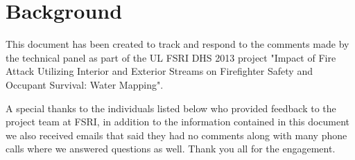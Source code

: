 \documentclass[12pt,oneside]{book}
\begin{document}
\mainmatter

\chapter*{Background}
\label{background}

This document has been created to track and respond to the comments made by the technical panel as part of the UL FSRI DHS 2013 project "Impact of Fire Attack Utilizing Interior and Exterior Streams on Firefighter Safety and Occupant Survival: Water Mapping". 

A special thanks to the individuals listed below who provided feedback to the project team at FSRI, in addition to the information contained in this document we also received emails that said they had no comments along with many phone calls where we answered questions as well.  Thank you all for the engagement. 
\end{document}
